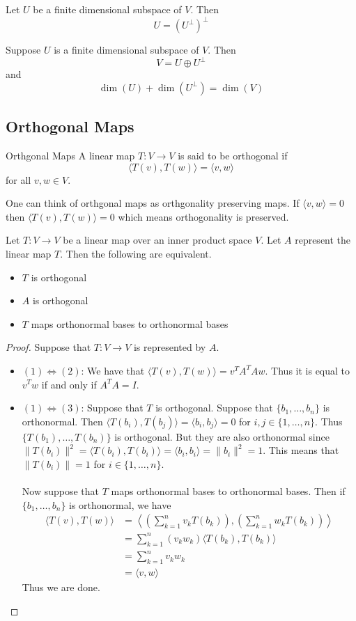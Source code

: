 \documentclass[a4paper]{article}
\begin{document}
\begin{prp}{}{} Let $U$ be a finite dimensional subspace of $V$. Then $$U=(U^\perp)^\perp$$
\end{prp}

\begin{thm}{}{} Suppose $U$ is a finite dimensional subspace of $V$. Then $$V=U\oplus U^\perp$$ and $$\dim(U)+\dim(U^\perp)=\dim(V)$$
\end{thm}

\subsection{Orthogonal Maps}
\begin{defn}{Orthgonal Maps}{} A linear map $T:V\to V$ is said to be orthogonal if $$\langle T(v), T(w)\rangle=\langle v, w\rangle$$ for all $v,w\in V$. 
\end{defn}

One can think of orthgonal maps as orthgonality preserving maps. If $\langle v,w\rangle=0$ then $\langle T(v),T(w)\rangle=0$ which means orthogonality is preserved.

\begin{prp}{}{} Let $T:V\to V$ be a linear map over an inner product space $V$. Let $A$ represent the linear map $T$. Then the following are equivalent. 
\begin{itemize}
\item $T$ is orthogonal
\item $A$ is orthogonal
\item $T$ maps orthonormal bases to orthonormal bases
\end{itemize} \tcbline
\begin{proof} Suppose that $T:V\to V$ is represented by $A$. 
\begin{itemize}
\item $(1)\iff(2)$: We have that $\langle T(v),T(w)\rangle=v^TA^TAw$. Thus it is equal to $v^Tw$ if and only if $A^TA=I$. 
\item $(1)\iff(3)$: Suppose that $T$ is orthogonal. Suppose that $\{b_1,\dots,b_n\}$ is orthonormal. Then $\langle T(b_i),T(b_j)\rangle=\langle b_i,b_j\rangle=0$ for $i,j\in\{1,\dots,n\}$. Thus $\{T(b_1),\dots,T(b_n)\}$ is orthogonal. But they are also orthonormal since $\|T(b_i)\|^2=\langle T(b_i),T(b_i)\rangle=\langle b_i,b_i\rangle=\|b_i\|^2=1$. This means that $\|T(b_i)\|=1$ for $i\in\{1,\dots,n\}$. \\~\\
Now suppose that $T$ maps orthonormal bases to orthonormal bases. Then if $\{b_1,\dots,b_n\}$ is orthonormal, we have 
\begin{align*}
\langle T(v),T(w)\rangle&=\left\langle\left(\sum_{k=1}^nv_kT(b_k)\right),\left(\sum_{k=1}^nw_kT(b_k)\right)\right\rangle\\
&=\sum_{k=1}^n(v_kw_k)\langle T(b_k),T(b_k)\rangle\tag{$\langle T(b_i),T(b_j)\rangle=0$ if $i\neq j$}\\
&=\sum_{k=1}^nv_kw_k\\
&=\langle v,w\rangle
\end{align*}
Thus we are done. 
\end{itemize}
\end{proof}
\end{prp}
\end{document}
